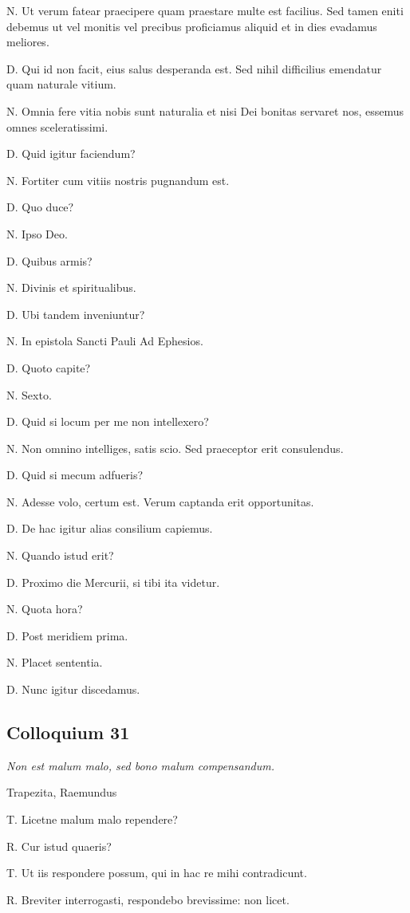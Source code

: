 \documentclass{article}
\begin{document}
N. Ut verum fatear praecipere quam praestare multe est facilius. Sed tamen eniti debemus ut vel monitis vel precibus proficiamus aliquid et in dies evadamus meliores.

D. Qui id non facit, eius salus desperanda est. Sed nihil difficilius emendatur quam naturale vitium.

N. Omnia fere vitia nobis sunt naturalia et nisi Dei bonitas servaret nos, essemus omnes sceleratissimi.

D. Quid igitur faciendum?

N. Fortiter cum vitiis nostris pugnandum est.

D. Quo duce?

N. Ipso Deo.

D. Quibus armis?

N. Divinis et spiritualibus.

D. Ubi tandem inveniuntur?

N. In epistola Sancti Pauli Ad Ephesios.

D. Quoto capite?

N. Sexto.

D. Quid si locum per me non intellexero?

N. Non omnino intelliges, satis scio. Sed praeceptor erit consulendus.

D. Quid si mecum adfueris?

N. Adesse volo, certum est. Verum captanda erit opportunitas.

D. De hac igitur alias consilium capiemus.

N. Quando istud erit?

D. Proximo die Mercurii, si tibi ita videtur.

N. Quota hora?

D. Post meridiem prima.

N. Placet sententia.

D. Nunc igitur discedamus.

\subsection{Colloquium 31}
\emph{Non est malum malo, sed bono malum compensandum.}

Trapezita, Raemundus

T. Licetne malum malo rependere?

R. Cur istud quaeris?

T. Ut iis respondere possum, qui in hac re mihi contradicunt.

R. Breviter interrogasti, respondebo brevissime: non licet.
\end{document}
